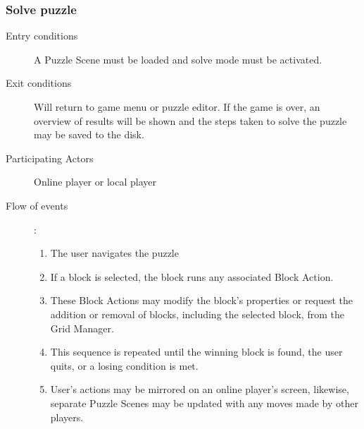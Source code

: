 \documentclass[12pt]{article}
\begin{document}
    \subsubsection{Solve puzzle}
    \begin{description}
        \item[Entry conditions] A Puzzle Scene must be loaded and solve mode
            must be activated.
        \item[Exit conditions] Will return to game menu or puzzle editor.
            If the game is
            over, an overview of results will be shown and the steps taken to solve
            the puzzle may be saved to the disk.
        \item[Participating Actors] Online player or local player
        \item[Flow of events]:
            \begin{enumerate}
                \item The user navigates the puzzle
                \item If a block is selected, the block runs any associated
                    Block Action.
                \item These Block Actions may modify the block's properties or
                    request the addition or removal of blocks, including the
                    selected block, from the Grid Manager.
                \item This sequence is repeated until the winning block is
                    found, the user quits, or a losing condition is met.
                \item User's actions may be mirrored on an online player's
                    screen, likewise, separate Puzzle Scenes  may be updated
                    with any moves made by other players.
            \end{enumerate}
    \end{description}


\end{document}
